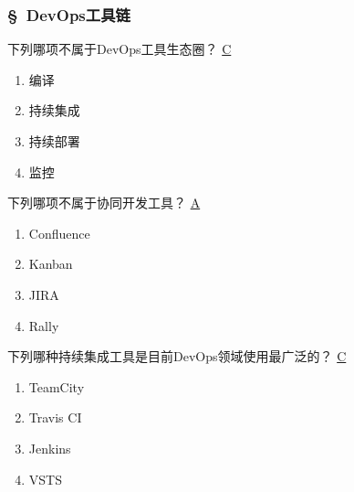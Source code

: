 \subsubsection*{\S\ DevOps工具链}
\setcounter{problemname}{0}

\begin{problem}
	下列哪项不属于DevOps工具生态圈？
	\uline{C}    
    \vspace{-0.8em}
    \begin{multicols}{4}
        \begin{enumerate}[label=\Alph*.]
            \item 编译
            \item 持续集成
            \item 持续部署
            \item 监控
        \end{enumerate}
    \end{multicols}
    \vspace{-1em}
\end{problem}



\begin{problem}
	下列哪项不属于协同开发工具？
	\uline{A}    
    \vspace{-0.8em}
    \begin{multicols}{4}
        \begin{enumerate}[label=\Alph*.]
            \item Confluence
            \item Kanban
            \item JIRA
            \item Rally
        \end{enumerate}
    \end{multicols}
    \vspace{-1em}
\end{problem}


\begin{problem}
	下列哪种持续集成工具是目前DevOps领域使用最广泛的？
	\uline{C}    
    \vspace{-0.8em}
    \begin{multicols}{4}
        \begin{enumerate}[label=\Alph*.]
            \item TeamCity
            \item Travis CI
            \item Jenkins
            \item VSTS
        \end{enumerate}
    \end{multicols}
    \vspace{-1em}
\end{problem}


